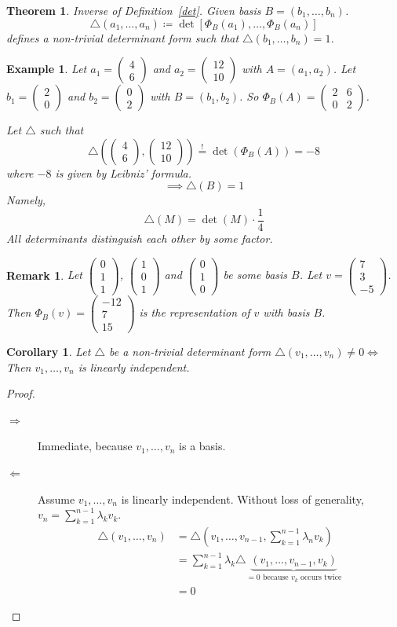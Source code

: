 \documentclass[a4paper]{article}
\newcounter{lecref}[section]
\numberwithin{lecref}{section}
\newtheorem{theorem}[lecref]{Theorem}
\newtheorem*{Example}{Example}
\newtheorem*{Remark}{Remark}
\newtheorem{corollary}[lecref]{Corollary}
\newcommand{\vectwo}[2]{\begin{pmatrix} #1 \\ #2 \end{pmatrix}}
\newcommand{\vecthree}[3]{\begin{pmatrix} #1 \\ #2 \\ #3 \end{pmatrix}}
\begin{document}
\begin{theorem} %
  \label{theorem722}
  Inverse of Definition~\ref{det}. %
  Given basis $B = (b_1, \dots, b_n)$.
  \[ \triangle(a_1, \dots, a_n) \coloneqq \det\left[\Phi_B(a_1), \dots, \Phi_B(a_n)\right] \]
  defines a non-trivial determinant form such that $\triangle(b_1, \dots, b_n) = 1$.
\end{theorem}

\begin{Example}
  Let $a_1 = \vectwo46$ and $a_2 = \vectwo{12}{10}$ with $A = (a_1, a_2)$.
  Let $b_1 = \vectwo20$ and $b_2 = \vectwo02$ with $B = (b_1, b_2)$.
  So $\Phi_B(A) = \begin{pmatrix} 2 & 6 \\ 0 & 2 \end{pmatrix}$.

  Let $\triangle$ such that
  \[ \triangle(\vectwo46, \vectwo{12}{10}) \overset!= \det(\Phi_B(A)) = -8 \]
  where $-8$ is given by Leibniz' formula.
  \[ \implies \triangle(B) = 1 \]
  Namely,
  \[ \triangle(M) = \det(M) \cdot \frac14 \]
  All determinants distinguish each other by some factor.
\end{Example}

\begin{Remark}
  Let $\vecthree011$, $\vecthree101$ and $\vecthree010$ be some basis $B$.
  Let $v = \vecthree{7}{3}{-5}$. Then $\Phi_B(v) = \vecthree{-12}{7}{15}$ is the representation of $v$ with basis $B$.
\end{Remark}

\begin{corollary} %
  \label{folgerung723}
  Let $\triangle$ be a non-trivial determinant form $\triangle(v_1, \dots, v_n) \neq 0 \iff$
  Then $v_1, \dots, v_n$ is linearly independent.
\end{corollary}
\begin{proof}
  \begin{description}
    \item[$\Rightarrow$] Immediate, because $v_1, \dots, v_n$ is a basis.
    \item[$\Leftarrow$]
      Assume $v_1, \dots, v_n$ is linearly independent.
      Without loss of generality, $v_n = \sum_{k=1}^{n-1} \lambda_k v_k$.
      \begin{align*}
        \triangle(v_1, \dots, v_n)
          &= \triangle(v_1, \dots, v_{n-1}, \sum_{k=1}^{n-1} \lambda_n v_k) \\
          &= \sum_{k=1}^{n-1} \lambda_k \triangle \underbrace{(v_1, \dots, v_{n-1}, v_k)}_{=0 \text{ because $v_k$ occurs twice}} \\
          &= 0
      \end{align*}
  \end{description}
\end{proof}
\end{document}
